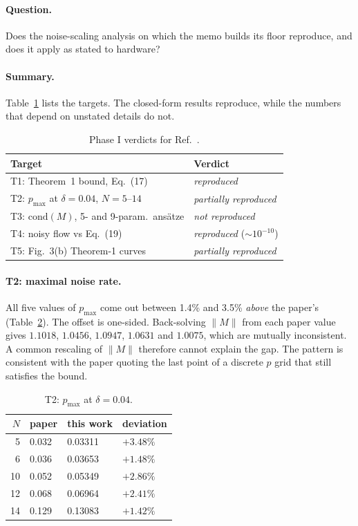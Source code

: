 \documentclass[aps,pra,reprint,superscriptaddress,nofootinbib]{revtex4-2}
\newcommand{\cond}{\mathrm{cond}}
\newcommand{\verdict}[1]{\textsl{#1}}
\begin{document}
\paragraph*{Question.} Does the noise-scaling analysis on which the memo builds its floor
reproduce, and does it apply as stated to hardware?

\paragraph*{Summary.} Table~\ref{tab:qdp} lists the targets. The closed-form results reproduce,
while the numbers that depend on unstated details do not.

\begin{table}[t]
\caption{Phase I verdicts for Ref.~\cite{QDP2024}.}
\label{tab:qdp}
\begin{ruledtabular}
\begin{tabular}{p{3.9cm}l}
Target & Verdict \\
\midrule
T1: Theorem~1 bound, Eq.~(17) & \verdict{reproduced} \\
T2: $p_{\max}$ at $\delta=0.04$, $N=5$--$14$ & \verdict{partially reproduced} \\
T3: $\cond(M)$, 5- and 9-param.\ ansätze & \verdict{not reproduced} \\
T4: noisy flow vs Eq.~(19) & \verdict{reproduced} ($\sim10^{-10}$) \\
T5: Fig.~3(b) Theorem-1 curves & \verdict{partially reproduced} \\
\end{tabular}
\end{ruledtabular}
\end{table}

\paragraph*{T2: maximal noise rate.} All five values of $p_{\max}$ come out between 1.4\% and
3.5\% \emph{above} the paper's (Table~\ref{tab:qdp_t2}). The offset is one-sided. Back-solving
$\|M\|$ from each paper value gives $1.1018$, $1.0456$, $1.0947$, $1.0631$ and $1.0075$, which
are mutually inconsistent. A common rescaling of $\|M\|$ therefore cannot explain the gap. The
pattern is consistent with the paper quoting the last point of a discrete $p$ grid that still
satisfies the bound.

\begin{table}[t]
\caption{T2: $p_{\max}$ at $\delta=0.04$.}
\label{tab:qdp_t2}
\begin{ruledtabular}
\begin{tabular}{rlll}
$N$ & paper & this work & deviation \\
\midrule
5  & 0.032 & 0.03311 & $+3.48\%$ \\
6  & 0.036 & 0.03653 & $+1.48\%$ \\
10 & 0.052 & 0.05349 & $+2.86\%$ \\
12 & 0.068 & 0.06964 & $+2.41\%$ \\
14 & 0.129 & 0.13083 & $+1.42\%$ \\
\end{tabular}
\end{ruledtabular}
\end{table}
\end{document}
